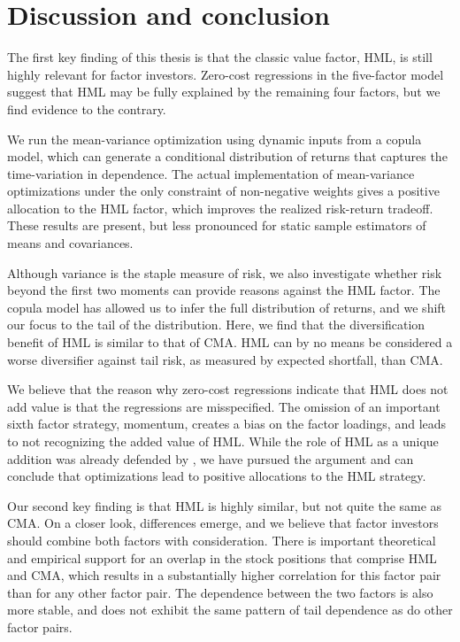 
\section{Discussion and conclusion} %
\label{sec:discussion_conclusion}

The first key finding of this thesis is that the classic value factor, HML, is still highly relevant for factor investors. Zero-cost regressions in the five-factor model suggest that HML may be fully explained by the remaining four factors, but we find evidence to the contrary. 

We run the mean-variance optimization using dynamic inputs from a copula model, which can generate a conditional distribution of returns that captures the time-variation in dependence. The actual implementation of mean-variance optimizations under the only constraint of non-negative weights gives a positive allocation to the HML factor, which improves the realized risk-return tradeoff. These results are present, but less pronounced for static sample estimators of means and covariances.

Although variance is the staple measure of risk, we also investigate whether risk beyond the first two moments can provide reasons against the HML factor. The copula model has allowed us to infer the full distribution of returns, and we shift our focus to the tail of the distribution. Here, we find that the diversification benefit of HML is similar to that of CMA. HML can by no means be considered a worse diversifier against tail risk, as measured by expected shortfall, than CMA.

We believe that the reason why zero-cost regressions indicate that HML does not add value is that the regressions are misspecified. The omission of an important sixth factor strategy, momentum, creates a bias on the factor loadings, and leads to not recognizing the added value of HML. While the role of HML as a unique addition was already defended by \textcite{Asness2015}, we have pursued the argument and can conclude that optimizations lead to positive allocations to the HML strategy.

Our second key finding is that HML is highly similar, but not quite the same as CMA. On a closer look, differences emerge, and we believe that factor investors should combine both factors with consideration. There is important theoretical and empirical support for an overlap in the stock positions that comprise HML and CMA, which results in a substantially higher correlation for this factor pair than for any other factor pair. The dependence between the two factors is also more stable, and does not exhibit the same pattern of tail dependence as do other factor pairs. 

